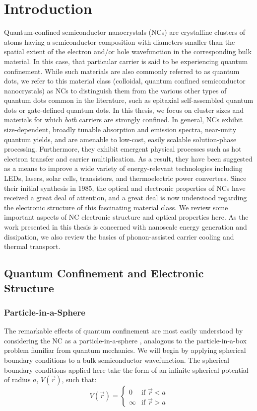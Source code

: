 \chapter{Introduction}	%
Quantum-confined semiconductor nanocrystals (NCs) are crystalline clusters of atoms having a semiconductor composition with diameters smaller than the spatial extent of the electron and/or hole wavefunction in the corresponding bulk material. In this case, that particular carrier is said to be experiencing quantum confinement. While such materials are also commonly referred to as quantum dots, we refer to this material class (colloidal, quantum confined semiconductor nanocrystals) as NCs to distinguish them from the various other types of quantum dots common in the literature, such as epitaxial self-assembled quantum dots or gate-defined quantum dots. In this thesis, we focus on cluster sizes and materials for which \emph{both} carriers are strongly confined. In general, NCs exhibit size-dependent, broadly tunable absorption and emission spectra, near-unity quantum yields, and are amenable to low-cost, easily scalable solution-phase processing. Furthermore, they exhibit emergent physical processes such as hot electron transfer and carrier multiplication. As a result, they have been suggested as a means to improve a wide variety of energy-relevant technologies including LEDs, lasers, solar cells, transistors, and thermoelectric power converters. Since their initial synthesis in 1985, the optical and electronic properties of NCs have received a great deal of attention, and a great deal is now understood regarding the electronic structure of this fascinating material class. We review some important aspects of NC electronic structure and optical properties here. As the work presented in this thesis is concerned with nanoscale energy generation and dissipation, we also review the basics of phonon-assisted carrier cooling and thermal transport.

\section{Quantum Confinement and Electronic Structure}
\subsection{Particle-in-a-Sphere}
The remarkable effects of quantum confinement are most easily understood by considering the NC as a particle-in-a-sphere \cite{efros1982interband, brus1986electronic}, analogous to the particle-in-a-box problem familiar from quantum mechanics. We will begin by applying spherical boundary conditions to a bulk semiconductor wavefunction. The spherical boundary conditions applied here take the form of an infinite spherical potential of radius $a$, $V(\vec{r})$, such that:
\begin{equation}\label{eq:pis1}
V(\vec{r}) = \left\{
	\begin{array}{ll}
		0 & \mbox{if } \vec{r} < a \\
		\infty & \mbox{if } \vec{r} > a
	\end{array}
\right.
\end{equation}

